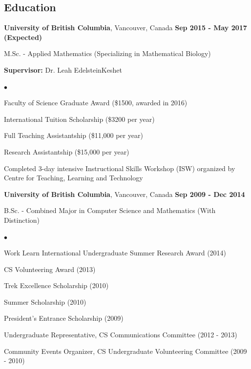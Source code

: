 \documentclass[margin,line]{res}
\newenvironment{list1}{
  \begin{list}{\ding{113}}{
      \setlength{\itemsep}{0in}
      \setlength{\parsep}{0in} \setlength{\parskip}{0in}
      \setlength{\topsep}{0in} \setlength{\partopsep}{0in} 
      \setlength{\leftmargin}{0.17in}}}{\end{list}}
\newenvironment{list2}{
  \begin{list}{$\bullet$}{
      \setlength{\itemsep}{0in}
      \setlength{\parsep}{0in} \setlength{\parskip}{0in}
      \setlength{\topsep}{0in} \setlength{\partopsep}{0in} 
      \setlength{\leftmargin}{0.2in}}}{\end{list}}
\newenvironment{list3}{
  \begin{list}{\textopenbullet}{
      \setlength{\itemsep}{0in}
      \setlength{\parsep}{0in} \setlength{\parskip}{0in}
      \setlength{\topsep}{0in} \setlength{\partopsep}{0in} 
      \setlength{\leftmargin}{0.1in}}}{\end{list}}
\begin{document}
\begin{resume}
\section{\sc Education}

{\bf University of British Columbia}, Vancouver, Canada  \hfill {\bf Sep 2015 - May 2017 (Expected)}\\
\vspace*{-.2cm}
\begin{list1}
\item[] M.Sc. - Applied Mathematics (Specializing in Mathematical Biology)
\vspace*{.05cm}
\item[] {\bf Supervisor:} Dr. Leah Edelstein{\textendash}Keshet
\begin{list2}
\vspace*{.1cm}
\item Faculty of Science Graduate Award (\$1500, awarded in 2016)
\item International Tuition Scholarship (\$3200 per year)
\item Full Teaching Assistantship (\$11,000 per year)
\item Research Assistantship (\$15,000 per year)
\begin{list3}
\vspace*{.1cm}
\item Completed 3-day intensive Instructional Skills Workshop (ISW) organized by Centre for Teaching, Learning and Technology
\end{list3}
\end{list2}
\end{list1}
\vspace*{.2cm}
 
{\bf University of British Columbia}, Vancouver, Canada  \hfill {\bf Sep 2009 - Dec 2014}\\
\vspace*{-.2cm}
\begin{list1}
\item[] B.Sc. - Combined Major in Computer Science and Mathematics (With Distinction)
\begin{list2}
\vspace*{.1cm}
\item Work Learn International Undergraduate Summer Research Award (2014)
\item CS Volunteering Award (2013)
\item Trek Excellence Scholarship (2010)
\item Summer Scholarship (2010)
\item President's Entrance Scholarship (2009)
\begin{list3}
\vspace*{.1cm}
\item Undergraduate Representative, CS Communications Committee (2012 - 2013)
\item Community Events Organizer, CS Undergraduate Volunteering Committee (2009 - 2010)
\end{list3}
\end{list2}
\end{list1}


\end{resume}
\end{document}
